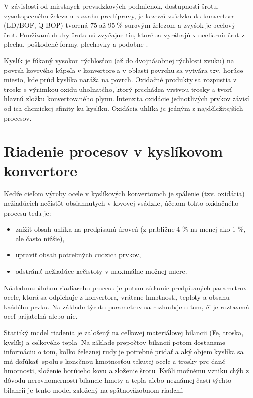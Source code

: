 \documentclass[]{tukediphc}
\begin{document}
V závislosti od miestnych prevádzkových podmienok, dostupnosti šrotu, vysokopecného železa a rozsahu predúpravy, je kovová vsádzka do konvertora (LD/BOF, Q-BOP) tvorená 75 až 95 \% surovým železom a zvyšok je oceľový šrot. Používané druhy šrotu sú zvyčajne tie, ktoré sa vyrábajú v oceliarni: šrot z plechu, poškodené formy, plechovky a podobne \cite{Turkdogan1996}.

Kyslík je fúkaný vysokou rýchlosťou (až do dvojnásobnej rýchlosti zvuku) na povrch kovového kúpeľa v konvertore a v oblasti povrchu sa vytvára tzv. horúce miesto, kde prúd kyslíka naráža na povrch. Oxidačné produkty sa rozpustia v troske s výnimkou oxidu uhoľnatého, ktorý prechádza vrstvou trosky a tvorí hlavnú zložku konvertovaného plynu. Intenzita oxidácie jednotlivých prvkov závisí od ich chemickej afinity ku kyslíku. Oxidácia uhlíka je jedným z najdôležitejších procesov.

\section{Riadenie procesov v kyslíkovom konvertore}

Keďže cieľom výroby ocele v kyslíkových konvertoroch je spálenie (tzv. oxidácia) nežiadúcich nečistôt obsiahnutých v kovovej vsádzke, účelom tohto oxidačného procesu teda je:

\begin{itemize}
	\item znížiť obsah uhlíka na predpísanú úroveň (z približne 4 \% na menej ako 1 \%, ale často nižšie),
	\item upraviť obsah potrebných cudzích prvkov,
	\item odstrániť nežiadúce nečistoty v maximálne možnej miere.
\end{itemize}

Následnou úlohou riadiaceho procesu je potom získanie predpísaných parametrov ocele, ktorá sa odpichuje z konvertora, vrátane hmotnosti, teploty a obsahu každého prvku. Na základe týchto parametrov sa rozhoduje o tom, či je roztavená oceľ prijateľná alebo nie.

Statický model riadenia je založený na celkovej materiálovej bilancii (Fe, troska, kyslík) a celkového tepla. Na základe prepočtov bilancií potom dostaneme informáciu o tom, koľko železnej rudy je potrebné pridať a aký objem kyslíka sa má dofúkať, spolu s konečnou hmotnosťou tekutej ocele a trosky pre dané hmotnosti, zloženie horúceho kovu a zloženie šrotu. Kvôli možnému vzniku chýb z dôvodu nerovnomernosti bilancie hmoty a tepla alebo neznámej časti týchto bilancií je tento model založený na spätnoväzobnom riadení.
\end{document}
